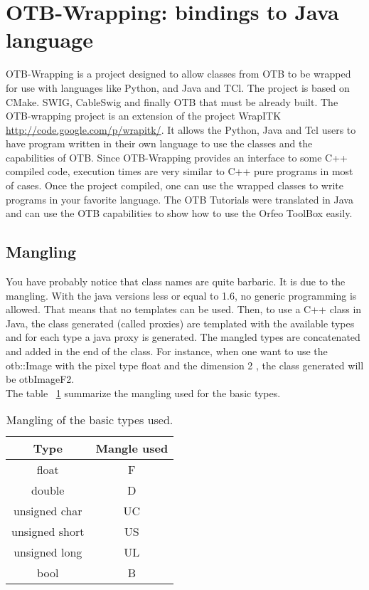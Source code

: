 \section{OTB-Wrapping: bindings to Java language}
OTB-Wrapping is a project designed to allow classes from OTB 
to be wrapped for use with languages like Python, and Java and TCl. 
The project is based on CMake. SWIG, CableSwig and finally OTB that must be already built.
 The OTB-wrapping project is an extension of the project WrapITK \url{http://code.google.com/p/wrapitk/}. 
It allows the Python, Java and Tcl users to have program written in their own language to use the classes and 
the capabilities of OTB.
Since OTB-Wrapping provides an interface to some C++ compiled code, execution times are very similar to C++ 
pure programs in most of cases.
Once the project compiled, one can use the wrapped classes to write programs in your favorite language.
The OTB Tutorials were translated in Java and can use the OTB capabilities to show how to use the 
Orfeo ToolBox easily. 

\subsection{Mangling}
You have probably notice that class names are quite barbaric. It is due to the mangling. 
With the java versions less or equal to 1.6, no generic programming is allowed. That means that no templates can be used. 
Then, to use a C++  class in Java, the class generated (called proxies) are templated with the available types and for each type a java proxy is generated. 
The mangled types are concatenated and added in the end of the class.
For instance, when one want to use the otb::Image with the pixel type float and the dimension 2 , the class generated will be otbImageF2. \\

The table ~\ref{tab:basictypetomangle} summarize the mangling used for the basic types. 

\begin{table}[!htbp]
\begin{center}
\begin{tabular}{|c|c|}
\hline
Type                  &  Mangle used  \\
\hline
float                 &  F         \\
double                &  D         \\
unsigned char         &  UC        \\
unsigned short        &  US        \\
unsigned long         &  UL        \\
bool                  &  B         \\

\hline 
\end{tabular}
\caption{Mangling of the basic types used.}\label{tab:basictypetomangle}
\end{center}
\end{table}

